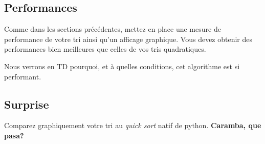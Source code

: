 \documentclass[11pt,a4paper]{article}
\begin{document}
\subsection{Performances}
Comme dans les sections précédentes, mettez en place une mesure de performance de votre tri ainsi qu'un afficage graphique. Vous devez obtenir des performances bien meilleures que celles de vos tris quadratiques.\ 

Nous verrons en TD pourquoi, et à quelles conditions, cet algorithme est si performant.

\subsection{Surprise}
Comparez graphiquement votre tri au {\em quick sort} natif de python. {\bf Caramba, que pasa?}
\end{document}
